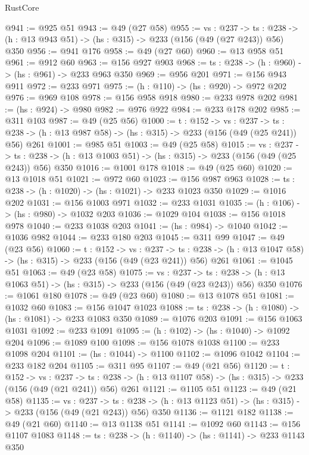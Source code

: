 \begin{lexlean}{RustCore}
\begin{coremodule}
@941 := @925 @51
@943 := @49 (@27 @58)
@955 := {vs : @237} ->
  {ts : @238} -> (h : @13 @943 @51) -> (hs : @315) -> @233 (@156 (@49 (@27 @243)) @56) @350
@956 := @941 @176
@958 := @49 (@27 @60)
@960 := @13 @958 @51
@961 := @912 @60
@963 := @156 @927 @903
@968 := {ts : @238} -> (h : @960) -> (hs : @961) -> @233 @963 @350
@969 := @956 @201
@971 := @156 @943 @911
@972 := @233 @971
@975 := (h : @110) -> (hs : @920) -> @972 @202
@976 := @969 @108
@978 := @156 @958 @918
@980 := @233 @978 @202
@981 := (hs : @924) -> @980
@982 := @976 @922
@984 := @233 @178 @202
@985 := @311 @103
@987 := @49 (@25 @56)
@1000 := {t : @152} ->
  {vs : @237} ->
  {ts : @238} -> (h : @13 @987 @58) -> (hs : @315) -> @233 (@156 (@49 (@25 @241)) @56) @261
@1001 := @985 @51
@1003 := @49 (@25 @58)
@1015 := {vs : @237} ->
  {ts : @238} -> (h : @13 @1003 @51) -> (hs : @315) -> @233 (@156 (@49 (@25 @243)) @56) @350
@1016 := @1001 @178
@1018 := @49 (@25 @60)
@1020 := @13 @1018 @51
@1021 := @972 @60
@1023 := @156 @987 @963
@1028 := {ts : @238} -> (h : @1020) -> (hs : @1021) -> @233 @1023 @350
@1029 := @1016 @202
@1031 := @156 @1003 @971
@1032 := @233 @1031
@1035 := (h : @106) -> (hs : @980) -> @1032 @203
@1036 := @1029 @104
@1038 := @156 @1018 @978
@1040 := @233 @1038 @203
@1041 := (hs : @984) -> @1040
@1042 := @1036 @982
@1044 := @233 @180 @203
@1045 := @311 @99
@1047 := @49 (@23 @56)
@1060 := {t : @152} ->
  {vs : @237} ->
  {ts : @238} -> (h : @13 @1047 @58) -> (hs : @315) -> @233 (@156 (@49 (@23 @241)) @56) @261
@1061 := @1045 @51
@1063 := @49 (@23 @58)
@1075 := {vs : @237} ->
  {ts : @238} -> (h : @13 @1063 @51) -> (hs : @315) -> @233 (@156 (@49 (@23 @243)) @56) @350
@1076 := @1061 @180
@1078 := @49 (@23 @60)
@1080 := @13 @1078 @51
@1081 := @1032 @60
@1083 := @156 @1047 @1023
@1088 := {ts : @238} -> (h : @1080) -> (hs : @1081) -> @233 @1083 @350
@1089 := @1076 @203
@1091 := @156 @1063 @1031
@1092 := @233 @1091
@1095 := (h : @102) -> (hs : @1040) -> @1092 @204
@1096 := @1089 @100
@1098 := @156 @1078 @1038
@1100 := @233 @1098 @204
@1101 := (hs : @1044) -> @1100
@1102 := @1096 @1042
@1104 := @233 @182 @204
@1105 := @311 @95
@1107 := @49 (@21 @56)
@1120 := {t : @152} ->
  {vs : @237} ->
  {ts : @238} -> (h : @13 @1107 @58) -> (hs : @315) -> @233 (@156 (@49 (@21 @241)) @56) @261
@1121 := @1105 @51
@1123 := @49 (@21 @58)
@1135 := {vs : @237} ->
  {ts : @238} -> (h : @13 @1123 @51) -> (hs : @315) -> @233 (@156 (@49 (@21 @243)) @56) @350
@1136 := @1121 @182
@1138 := @49 (@21 @60)
@1140 := @13 @1138 @51
@1141 := @1092 @60
@1143 := @156 @1107 @1083
@1148 := {ts : @238} -> (h : @1140) -> (hs : @1141) -> @233 @1143 @350

\end{coremodule}
\end{lexlean}
